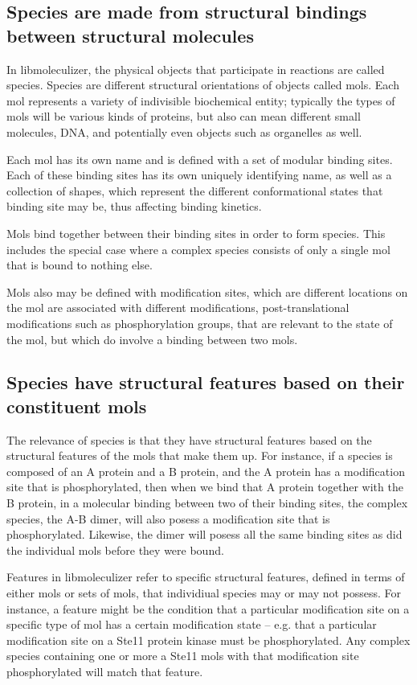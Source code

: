 \subsection{Species are made from structural bindings between
  structural molecules}

In libmoleculizer, the physical objects that participate in reactions
are called species. Species are different structural orientations of
objects called mols. Each mol represents a variety of indivisible
biochemical entity; typically the types of mols will be various kinds
of proteins, but also can mean different small molecules, DNA, and
potentially even objects such as organelles as well.

Each mol has its own name and is defined with a set of modular binding
sites.  Each of these binding sites has its own uniquely identifying
name, as well as a collection of shapes, which represent the different
conformational states that binding site may be, thus affecting binding
kinetics.  

Mols bind together between their binding sites in order to form
species.  This includes the special case where a complex species
consists of only a single mol that is bound to nothing else.

Mols also may be defined with modification sites, which are different
locations on the mol are associated with different modifications,
post-translational modifications such as phosphorylation groups, that
are relevant to the state of the mol, but which do involve a binding
between two mols.  

\subsection{Species have structural features based on their
 constituent mols}

The relevance of species is that they have structural features based
on the structural features of the mols that make them up.  For
instance, if a species is composed of an A protein and a B protein,
and the A protein has a modification site that is phosphorylated, then
when we bind that A protein together with the B protein, in a
molecular binding between two of their binding sites, the complex
species, the A-B dimer, will also posess a modification site that is
phosphorylated. Likewise, the dimer will posess all the same binding
sites as did the individual mols before they were bound.

Features in libmoleculizer refer to specific structural features,
defined in terms of either mols or sets of mols, that individiual
species may or may not possess. For instance, a feature might be the
condition that a particular modification site on a specific type of
mol has a certain modification state -- e.g. that a particular
modification site on a Ste11 protein kinase must be
phosphorylated. Any complex species containing one or more a Ste11
mols with that modification site phosphorylated will match that
feature.

